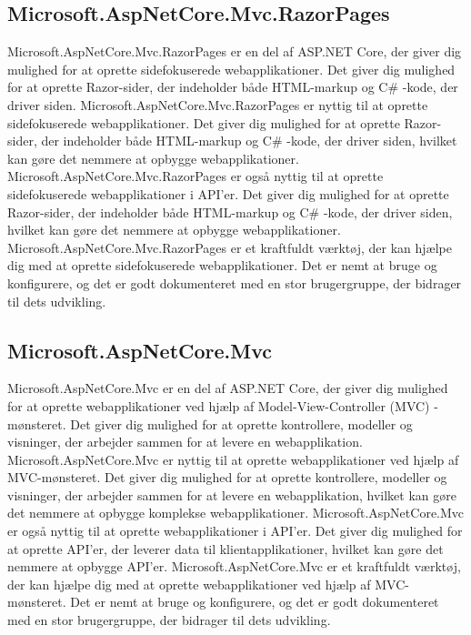 \subsection{Microsoft.AspNetCore.Mvc.RazorPages}
Microsoft.AspNetCore.Mvc.RazorPages er en del af ASP.NET Core, der giver dig mulighed for at oprette sidefokuserede webapplikationer. Det giver dig mulighed for at oprette Razor-sider, der indeholder både HTML-markup og C\# -kode, der driver siden.
Microsoft.AspNetCore.Mvc.RazorPages er nyttig til at oprette sidefokuserede webapplikationer. Det giver dig mulighed for at oprette Razor-sider, der indeholder både HTML-markup og C\# -kode, der driver siden, hvilket kan gøre det nemmere at opbygge webapplikationer.
Microsoft.AspNetCore.Mvc.RazorPages er også nyttig til at oprette sidefokuserede webapplikationer i API'er. Det giver dig mulighed for at oprette Razor-sider, der indeholder både HTML-markup og C\# -kode, der driver siden, hvilket kan gøre det nemmere at opbygge webapplikationer.
Microsoft.AspNetCore.Mvc.RazorPages er et kraftfuldt værktøj, der kan hjælpe dig med at oprette sidefokuserede webapplikationer. Det er nemt at bruge og konfigurere, og det er godt dokumenteret med en stor brugergruppe, der bidrager til dets udvikling.

\subsection{Microsoft.AspNetCore.Mvc}
Microsoft.AspNetCore.Mvc er en del af ASP.NET Core, der giver dig mulighed for at oprette webapplikationer ved hjælp af Model-View-Controller (MVC) -mønsteret. Det giver dig mulighed for at oprette kontrollere, modeller og visninger, der arbejder sammen for at levere en webapplikation.
Microsoft.AspNetCore.Mvc er nyttig til at oprette webapplikationer ved hjælp af MVC-mønsteret. Det giver dig mulighed for at oprette kontrollere, modeller og visninger, der arbejder sammen for at levere en webapplikation, hvilket kan gøre det nemmere at opbygge komplekse webapplikationer.
Microsoft.AspNetCore.Mvc er også nyttig til at oprette webapplikationer i API'er. Det giver dig mulighed for at oprette API'er, der leverer data til klientapplikationer, hvilket kan gøre det nemmere at opbygge API'er.
Microsoft.AspNetCore.Mvc er et kraftfuldt værktøj, der kan hjælpe dig med at oprette webapplikationer ved hjælp af MVC-mønsteret. Det er nemt at bruge og konfigurere, og det er godt dokumenteret med en stor brugergruppe, der bidrager til dets udvikling.

